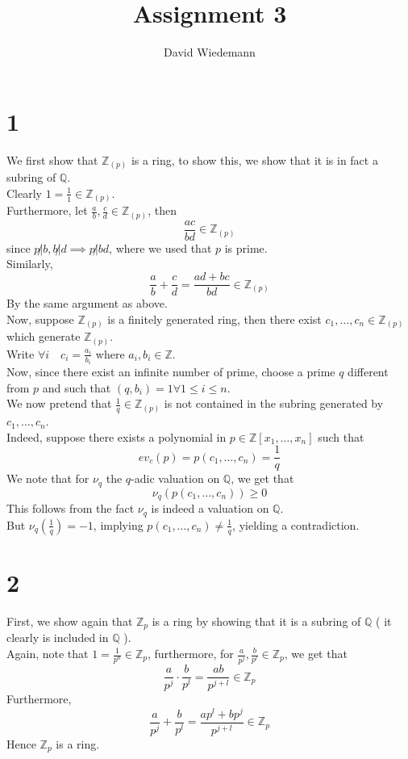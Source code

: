 \documentclass[11pt, a4paper]{article}
\begin{document}
\title{Assignment 3}
\author{David Wiedemann}
\maketitle
\section*{1}
We first show that $ \mathbb{Z}_{ ( p) } $ is a ring, to show this, we show that it is in fact a subring of $ \mathbb{Q}$.\\
Clearly $ 1 = \frac{1}{1}\in \mathbb{Z}_{ ( p) } $.\\
Furthermore, let $ \frac{a}{b}, \frac{c}{d}\in \mathbb{Z}_{ ( p) } $, then
\[ 
\frac{ac}{bd} \in \mathbb{Z}_{ ( p) } 
\]
since $ p\not|b , b\not| d \implies p \not | bd$, where we used that $p$ is prime.\\
Similarly, 
\[ 
\frac{a}{b} + \frac{c}{d} = \frac{ ad + bc}{bd} \in \mathbb{Z}_{ ( p) } 
\]
By the same argument as above.\\

Now, suppose $\mathbb{Z}_{ ( p) } $ is a finitely generated ring, then there exist $ c_1,\ldots,c_n\in \mathbb{Z}_{ ( p) } $ which generate $ \mathbb{Z}_{ ( p) } $.\\
Write $ \forall i \quad c_i = \frac{a_i}{b_i}$ where $a_i, b_i\in \mathbb{Z}$.\\
Now, since there exist an infinite number of prime, choose a prime $q$ different from $p$ and such that $ ( q, b_i) = 1\forall 1 \leq i \leq n$.\\
We now pretend that $ \frac{1}{q}\in \mathbb{Z}_{ ( p) } $ is not contained in the subring generated by $ c_1,\ldots, c_n$.\\
Indeed, suppose there exists a polynomial in $ p\in \mathbb{Z}[x_1,\ldots,x_n]$ such that 
\[ 
ev_c( p) = p( c_1,\ldots,c_n) = \frac{1}{q}
\]
We note that for $ \nu_q$ the $q$-adic valuation on $ \mathbb{Q}$, we get that
\[ 
\nu_q(p ( c_1,\ldots,c_n))  \geq 0
\]
This follows from the fact $\nu_q$ is indeed a valuation on $\mathbb{Q}$.\\
But $\nu_q( \frac{1}{q}) = -1$, implying $ p( c_1,\ldots,c_n) \neq \frac{1}{q}$, yielding a contradiction.
\section*{2}
First, we show again that $ \mathbb{Z}_p$ is a ring by showing that it is a subring of $ \mathbb{Q}$ ( it clearly is included in $ \mathbb{Q}$ ).\\
Again, note that $ 1= \frac{1}{p^{0}}\in \mathbb{Z}_p$, furthermore, for $ \frac{a}{p^{j}}, \frac{b}{p^{l}}\in \mathbb{Z}_p$, we get that
\[ 
\frac{a}{p^{j}}\cdot \frac{b}{p^{l}} = \frac{ab}{p^{j+l}} \in \mathbb{Z}_p
\]
Furthermore,
\[ 
\frac{a}{p^{j}} + \frac{b}{p^{l}} = \frac{ap^{l}+ bp^{j}}{p^{j+l}}\in \mathbb{Z}_p
\]
Hence $ \mathbb{Z}_p$ is a ring.\\
\end{document}
